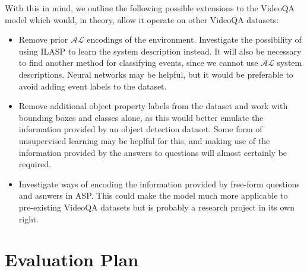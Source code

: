 \documentclass[../interim.tex]{subfiles}
\begin{document}
With this in mind, we outline the following possible extensions to the VideoQA model which would, in theory, allow it operate on other VideoQA datasets:
\begin{itemize}
  \item Remove prior $\mathcal{AL}$ encodings of the environment. Investigate the possibility of using ILASP to learn the system description instead. It will also be necessary to find another method for classifying events, since we cannot use $\mathcal{AL}$ system descriptions. Neural networks may be helpful, but it would be preferable to avoid adding event labels to the dataset.

  \item Remove additional object property labels from the dataset and work with bounding boxes and classes alone, as this would better emulate the information provided by an object detection dataset. Some form of unsupervised learning may be heplful for this, and making use of the information provided by the answers to questions will almost certainly be required.

  \item Investigate ways of encoding the information provided by free-form questions and asnwers in ASP. This could make the model much more applicable to pre-existing VideoQA datasets but is probably a research project in its own right.
\end{itemize}

\section{Evaluation Plan}

%
%

\end{document}
